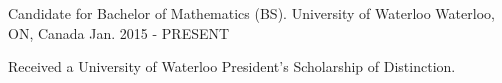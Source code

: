 

\begin{cventries}

  \cventry
    {Candidate for Bachelor of Mathematics (BS).} %
    {University of Waterloo} %
    {Waterloo, ON, Canada} %
    {Jan. 2015 - PRESENT} %
    {
      \begin{cvitems} %
        \item {Received a University of Waterloo President's Scholarship of Distinction.}
      \end{cvitems}
    }

\end{cventries}
